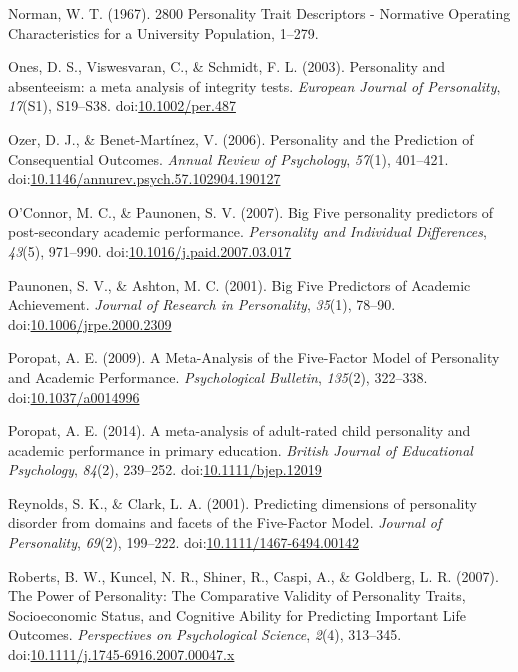 \documentclass[,man,floatsintext]{apa6}
\begin{document}
\hypertarget{ref-Norman1967}{}
Norman, W. T. (1967). 2800 Personality Trait Descriptors - Normative
Operating Characteristics for a University Population, 1--279.

\hypertarget{ref-Ones2003}{}
Ones, D. S., Viswesvaran, C., \& Schmidt, F. L. (2003). Personality and
absenteeism: a meta analysis of integrity tests. \emph{European Journal
of Personality}, \emph{17}(S1), S19--S38.
doi:\href{https://doi.org/10.1002/per.487}{10.1002/per.487}

\hypertarget{ref-OzerBenet2006}{}
Ozer, D. J., \& Benet-Martínez, V. (2006). Personality and the
Prediction of Consequential Outcomes. \emph{Annual Review of
Psychology}, \emph{57}(1), 401--421.
doi:\href{https://doi.org/10.1146/annurev.psych.57.102904.190127}{10.1146/annurev.psych.57.102904.190127}

\hypertarget{ref-OConnor2007}{}
O'Connor, M. C., \& Paunonen, S. V. (2007). Big Five personality
predictors of post-secondary academic performance. \emph{Personality and
Individual Differences}, \emph{43}(5), 971--990.
doi:\href{https://doi.org/10.1016/j.paid.2007.03.017}{10.1016/j.paid.2007.03.017}

\hypertarget{ref-Paunonen2001}{}
Paunonen, S. V., \& Ashton, M. C. (2001). Big Five Predictors of
Academic Achievement. \emph{Journal of Research in Personality},
\emph{35}(1), 78--90.
doi:\href{https://doi.org/10.1006/jrpe.2000.2309}{10.1006/jrpe.2000.2309}

\hypertarget{ref-Poropat2009}{}
Poropat, A. E. (2009). A Meta-Analysis of the Five-Factor Model of
Personality and Academic Performance. \emph{Psychological Bulletin},
\emph{135}(2), 322--338.
doi:\href{https://doi.org/10.1037/a0014996}{10.1037/a0014996}

\hypertarget{ref-Poropat2014}{}
Poropat, A. E. (2014). A meta-analysis of adult-rated child personality
and academic performance in primary education. \emph{British Journal of
Educational Psychology}, \emph{84}(2), 239--252.
doi:\href{https://doi.org/10.1111/bjep.12019}{10.1111/bjep.12019}

\hypertarget{ref-ClarkReynolds2001}{}
Reynolds, S. K., \& Clark, L. A. (2001). Predicting dimensions of
personality disorder from domains and facets of the Five-Factor Model.
\emph{Journal of Personality}, \emph{69}(2), 199--222.
doi:\href{https://doi.org/10.1111/1467-6494.00142}{10.1111/1467-6494.00142}

\hypertarget{ref-Roberts2007}{}
Roberts, B. W., Kuncel, N. R., Shiner, R., Caspi, A., \& Goldberg, L. R.
(2007). The Power of Personality: The Comparative Validity of
Personality Traits, Socioeconomic Status, and Cognitive Ability for
Predicting Important Life Outcomes. \emph{Perspectives on Psychological
Science}, \emph{2}(4), 313--345.
doi:\href{https://doi.org/10.1111/j.1745-6916.2007.00047.x}{10.1111/j.1745-6916.2007.00047.x}
\end{document}
